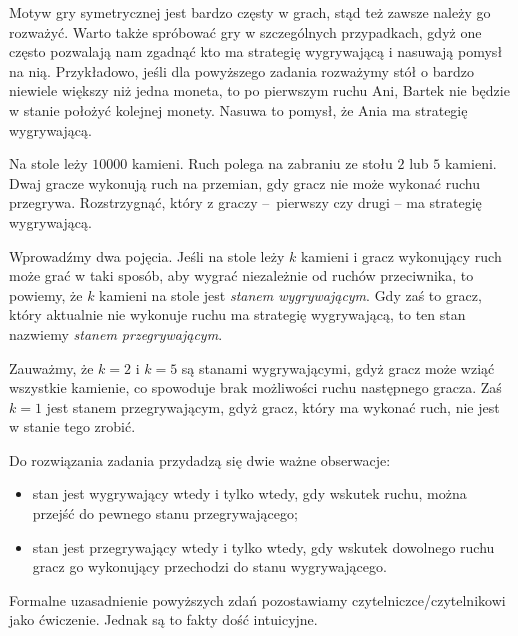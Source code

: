 \vspace{10px}

\noindent
Motyw gry symetrycznej jest bardzo częsty w grach, stąd też zawsze należy go rozważyć. Warto także spróbować gry w szczególnych przypadkach, gdyż one często pozwalają nam zgadnąć kto ma strategię wygrywającą i nasuwają pomysł na nią. Przykładowo, jeśli dla powyższego zadania rozważymy stół o bardzo niewiele większy niż jedna moneta, to po pierwszym ruchu Ani, Bartek nie będzie w stanie położyć kolejnej monety. Nasuwa to pomysł, że Ania ma strategię wygrywającą.

\vspace{10px}


\noindent
Na stole leży $10000$ kamieni. Ruch polega na zabraniu ze stołu $2$ lub $5$ kamieni. Dwaj gracze wykonują ruch na przemian, gdy gracz nie może wykonać ruchu przegrywa. Rozstrzygnąć, który z graczy – pierwszy czy drugi – ma strategię wygrywającą.

\vspace{5px}


\noindent
Wprowadźmy dwa pojęcia. Jeśli na stole leży $k$ kamieni i gracz wykonujący ruch może grać w taki sposób, aby wygrać niezależnie od ruchów przeciwnika, to powiemy, że $k$ kamieni na stole jest \textit{stanem wygrywającym}. Gdy zaś to gracz, który aktualnie nie wykonuje ruchu ma strategię wygrywającą, to ten stan nazwiemy \textit{stanem przegrywającym}.

\vspace{10px}
\noindent
Zauważmy, że $k = 2$ i $k = 5$ są stanami wygrywającymi, gdyż gracz może wziąć wszystkie kamienie, co spowoduje brak możliwości ruchu następnego gracza. Zaś $k = 1$ jest stanem przegrywającym, gdyż gracz, który ma wykonać ruch, nie jest w stanie tego zrobić.


\vspace{10px}
\noindent
Do rozwiązania zadania przydadzą się dwie ważne obserwacje:
\begin{itemize}
	\item stan jest wygrywający wtedy i tylko wtedy, gdy wskutek ruchu, można przejść do pewnego stanu przegrywającego; 
	\item stan jest przegrywający wtedy i tylko wtedy, gdy wskutek dowolnego ruchu gracz go wykonujący przechodzi do stanu wygrywającego.
\end{itemize}
Formalne uzasadnienie powyższych zdań pozostawiamy czytelniczce/czytelnikowi jako ćwiczenie. Jednak są to fakty dość intuicyjne.


